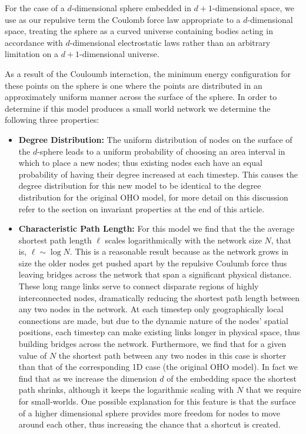 \documentclass[aps,pre,reprint,superscriptaddress,amsmath,amssymb,nofootinbib]{revtex4-1}
\begin{document}
For the case of a $d$-dimensional sphere embedded in $d+1$-dimensional space, we use as our repulsive term the Coulomb force law appropriate to a $d$-dimensional space, treating the sphere as a curved universe containing bodies acting in accordance with $d$-dimensional electrostatic laws rather than an arbitrary limitation on a $d+1$-dimensional universe.

As a result of the Couloumb interaction, the minimum energy configuration for these points on the sphere is one where the points are distributed in an approximately uniform manner across the surface of the sphere.
In order to determine if this model produces a small world network we determine the following three properties:
\begin{itemize}
  \item \textbf{Degree Distribution:} The uniform distribution of nodes on the surface of the $d$-sphere leads to a uniform probability of choosing an area interval in which to place a new nodes; thus existing nodes each have an equal probability of having their degree increased at each timestep.
This causes the degree distribution for this new model to be identical to the degree distribution for the original OHO model, for more detail on this discussion refer to the section on invariant properties at the end of this article.
  \item \textbf{Characteristic Path Length:} For this model we find that the the average shortest path length $\ell$ scales logarithmically with the network size $N$, that is, $\ell \sim \log N$. 
This is a reasonable result because as the network grows in size the older nodes get pushed apart by the repulsive Coulumb force thus leaving bridges across the network that span a significant physical distance.
These long range links serve to connect disparate regions of highly interconnected nodes, dramatically reducing the shortest path length between any two nodes in the network.
At each timestep only geographically local connections are made, but due to the dynamic nature of the nodes' spatial positions, each timestep can make existing links longer in physical space, thus building bridges across the network.
Furthermore, we find that for a given value of $N$ the shortest path between any two nodes in this case is shorter than that of the corresponding 1D case (the original OHO model).
In fact we find that as we increase the dimension $d$ of the embedding space the shortest path shrinks, although it keeps the logarithmic scaling with $N$ that we require for small-worlds.
One possible explanation for this feature is that the surface of a higher dimensional sphere provides more freedom for nodes to move around each other, thus increasing the chance that a shortcut is created.

\end{itemize}
\end{document}
